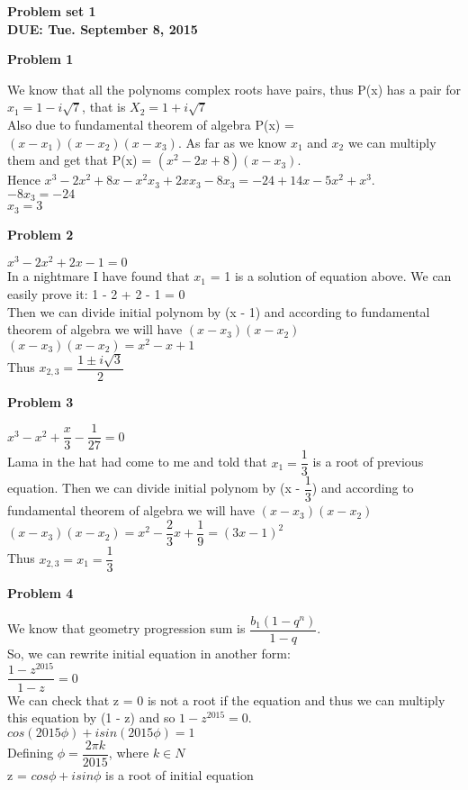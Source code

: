 \documentclass[12pt]{article}
\begin{document}
	\begin{center}
		\textbf{Problem set 1 \\
			DUE: Tue. September 8, 2015 \\}
	\end{center}
		
	\bigskip
	
	\textbf{Problem 1}		
		
	We know that all the polynoms complex roots have pairs, thus P(x) has a pair for $x_1= 1 - i\sqrt{7}$, that is $X_2 = 1 +  i\sqrt{7}$\\
	Also due to fundamental theorem of algebra P(x) = $(x - x_1)(x - x_2)(x - x_3)$. As far as we know $x_1$ and $x_2$ we can multiply them and get that P(x) = $(x^2 - 2x + 8)(x - x_3)$.\\
	Hence $x^3 - 2x^2 + 8x - x^2x_3 + 2xx_3 - 8x_3 =  -24+14x - 5x^2 +x^3$.\\
	$-8x_3 =  - 24$\\
	$x_3 = 3$
	
	\textbf{Problem 2}
	
	$x^3 - 2x^2 + 2x -1 = 0$\\
	In a nightmare I have found that $x_1$ = 1 is a solution of equation above. We can easily prove it: 1 - 2 + 2 - 1 = 0\\
	Then we can divide initial polynom by (x - 1) and according to fundamental theorem of algebra  we will have $(x - x_3)(x - x_2)$\\
	$(x - x_3)(x - x_2) = x^2 - x + 1$\\
	Thus $x_{2,3} = \dfrac{1 \pm i \sqrt{3}}{2}$
	
	\textbf{Problem 3}
	
	$x^3 - x^2 + \dfrac{x}{3} - \dfrac{1}{27} = 0$\\
	Lama in the hat had come to me and told that $x_1 = \dfrac{1}{3}$ is a root of previous equation.
	Then we can divide initial polynom by (x - $\dfrac{1}{3}$) and according to fundamental theorem of algebra  we will have $(x - x_3)(x - x_2)$\\
	$(x - x_3)(x - x_2) = x^2 - \dfrac{2}{3}x + \dfrac{1}{9} = (3x - 1)^2$\\
	Thus $x_{2,3} = x_1= \dfrac{1}{3}$
	
	\textbf{Problem 4}
	
	We know that geometry progression sum is $\dfrac{b_1(1 - q^n)}{1 - q}$.\\
	So, we can rewrite initial equation in another form:\\
	$\dfrac{1 - z^{2015}}{1 - z} = 0$\\
	We can check that z = 0 is not a root if the equation and thus we can multiply this equation by (1 - z) and so $1 - z^{2015} = 0$.\\
	$cos(2015\phi) + i sin(2015\phi) = 1$\\
	Defining $\phi = \dfrac{2\pi k}{2015}$, where $k \in N$\\
    z = $cos \phi + i sin \phi$ is a root of initial equation
    
\end{document}
